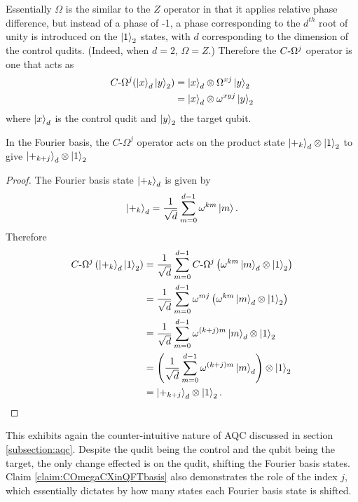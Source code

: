 Essentially $\Omega$ is the similar to the $Z$ operator in that it applies relative phase difference, but instead of a phase of -1, a phase corresponding to the $d^{th}$ root of unity is introduced on the $\ket{1}_2$ states, with $d$ corresponding to the dimension of the control qudits.
(Indeed, when $d=2$, $\Omega = Z$.)
Therefore the $C\text{-}\Omega^j$ operator is one that acts as
\begin{align}
    C\text{-}\Omega^j (\ket{x}_d\ket{y}_2) &= \ket{x}_d\otimes \Omega^{xj}\ket{y}_2\\
    & = \ket{x}_d\otimes \omega^{xyj}\ket{y}_2
\end{align}
where $\ket{x}_d$ is the control qudit and $\ket{y}_2$ the target qubit.

\begin{claim}
    \label{claim:COmegaCXinQFTbasis}
    In the Fourier basis, the $C\text{-}\Omega^j$ operator acts on the product state $\ket{+_k}_d\otimes\ket{1}_2$ to give $\ket{+_{k+j}}_d\otimes\ket{1}_2$
\end{claim}
\begin{proof}
    The Fourier basis state $\ket{+_k}_d$ is given by
    \begin{equation}
        \ket{+_k}_d = \frac{1}{\sqrt{d}}\sum_{m=0}^{d-1}\omega^{km}\ket{m}.
    \end{equation}
    Therefore
    \begin{align}
        C\text{-}\Omega^j\left(\ket{+_k}_d\ket{1}_2\right) 
        &= \frac{1}{\sqrt{d}}\sum_{m=0}^{d-1}C\text{-}\Omega^j\left(\omega^{km}\ket{m}_d\otimes\ket{1}_2\right)\\
        &= \frac{1}{\sqrt{d}}\sum_{m=0}^{d-1}\omega^{mj}\left(\omega^{km}\ket{m}_d\otimes\ket{1}_2\right)\\
        &= \frac{1}{\sqrt{d}}\sum_{m=0}^{d-1}\omega^{(k+j)m}\ket{m}_d\otimes\ket{1}_2\\
        &= \left(\frac{1}{\sqrt{d}}\sum_{m=0}^{d-1}\omega^{(k+j)m}\ket{m}_d\right)\otimes\ket{1}_2\\
        &= \ket{+_{k+j}}_d\otimes\ket{1}_2.
    \end{align}
\end{proof}
This exhibits again the counter-intuitive nature of AQC discussed in section \ref{subsection:aqc}.
Despite the qudit being the control and the qubit being the target, the only change effected is on the qudit, shifting the Fourier basis states.
Claim \ref{claim:COmegaCXinQFTbasis} also demonstrates the role of the index $j$, which essentially dictates by how many states each Fourier basis state is shifted.

